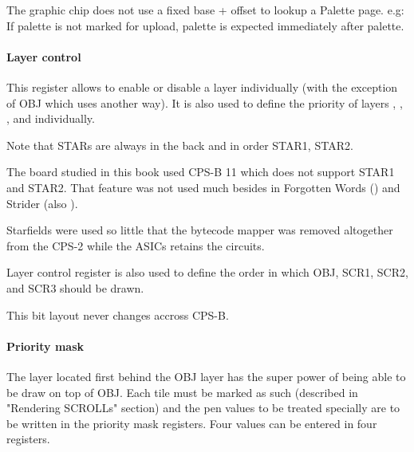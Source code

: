 The graphic chip does not use a fixed base + offset to lookup a Palette page. e.g: If  palette is not marked for upload,  palette is expected immediately after  palette.



\paragraph{Layer control} This register allows to enable or disable a layer individually (with the exception of OBJ which uses another way). It is also used to define the priority of layers , , , and  individually.

Note that STARs are always in the back and in order STAR1, STAR2.
  
 

The board studied in this book used CPS-B 11 which does not support STAR1 and STAR2. That feature was not used much besides in Forgotten Words () and Strider (also ).

\begin{trivia}
Starfields were used so little that the bytecode mapper was removed altogether from the CPS-2 while the ASICs retains the circuits.
\end{trivia}

Layer control register is also used to define the order in which OBJ, SCR1, SCR2, and SCR3 should be drawn.

 

This bit layout never changes accross CPS-B.

\paragraph{Priority mask}
The layer located first behind the OBJ layer has the super power of being able to be draw on top of OBJ. Each tile must be marked as such (described in "Rendering SCROLLs" section) and the pen values to be treated specially are to be written in the priority mask registers. Four values can be entered in four registers.



 






